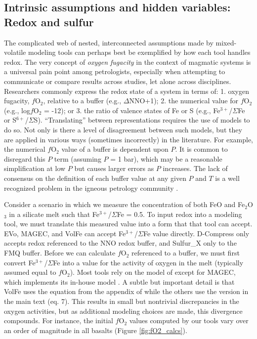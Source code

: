 \documentclass[draft, english]{volcanica-template}
\begin{document}
\subsection{Intrinsic assumptions and hidden variables: Redox and sulfur}
\label{sec:intrinsic-assumptions}
The complicated web of nested, interconnected assumptions made by mixed-volatile modeling tools can perhaps best be exemplified by how each tool handles redox. The very concept of \textit{oxygen fugacity} in the context of magmatic systems is a universal pain point among petrologists, especially when attempting to communicate or compare results across studies, let alone across disciplines. Researchers commonly express the redox state of a system in terms of: 1. oxygen fugacity, $f$O$_2$, relative to a buffer (e.g., $\Delta$NNO+1); 2. the numerical value for $f$O$_2$ (e.g., log$f$O$_2$ = -12); or 3. the ratio of valence states of Fe or S (e.g., Fe$^{3+}$/$\Sigma$Fe or S$^{6+}$/$\Sigma$S). ``Translating'' between representations requires the use of models to do so. Not only is there a level of disagreement between such models, but they are applied in various ways (sometimes incorrectly) in the literature. For example, the numerical $f$O$_2$ value of a buffer is dependent upon $P$. It is common to disregard this $P$ term (assuming $P$ = 1 bar), which may be a reasonable simplification at low $P$ but causes larger errors as $P$ increases. The lack of consensus on the definition of each buffer value at any given $P$ and $T$ is a well recognized problem in the igneous petrology community \parencite{wieser2023pysulfsat, anenburg2019redox}.

Consider a scenario in which we measure the concentration of both FeO and Fe$_2$O$_3$ in a silicate melt such that Fe$^{3+}$/$\Sigma$Fe = 0.5. To input redox into a modeling tool, we must translate this measured value into a form that that tool can accept. EVo, MAGEC, and VolFe can accept Fe$^{3+}$/$\Sigma$Fe value directly. D-Compress only accepts redox referenced to the NNO redox buffer, and Sulfur\_X only to the FMQ buffer. Before we can calculate $f$O$_2$ referenced to a buffer, we must first convert Fe$^{3+}$/$\Sigma$Fe into a value for the activity of oxygen in the melt (typically assumed equal to $f$O$_2$). Most tools rely on the model of \textcite{Kress1991} except for MAGEC, which implements its in-house model \parencite{Sun2024}. A subtle but important detail is that VolFe uses the equation from the appendix of \textcite[][eqs. A-5 and A-6]{Kress1991} while the others use the version in the main text (eq. 7). This results in small but nontrivial discrepancies in the oxygen activities, but as additional modeling choices are made, this divergence compounds. For instance, the initial $f$O$_2$ values computed by our tools vary over an order of magnitude in all basalts (Figure \ref{fig:fO2_calcs}). 
\end{document}
